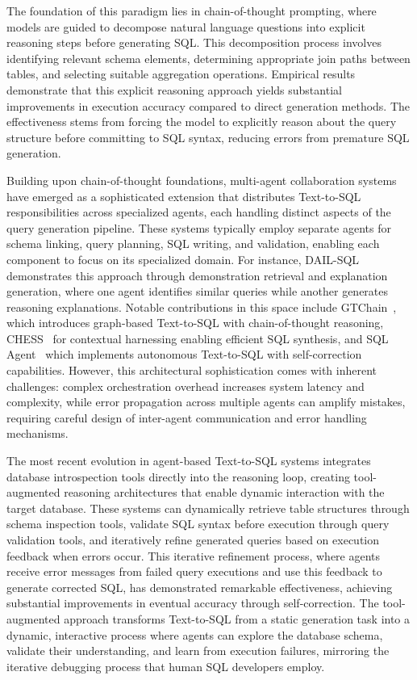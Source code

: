 The foundation of this paradigm lies in chain-of-thought prompting, where models are guided to decompose natural language questions into explicit reasoning steps before generating SQL. This decomposition process involves identifying relevant schema elements, determining appropriate join paths between tables, and selecting suitable aggregation operations. Empirical results demonstrate that this explicit reasoning approach yields substantial improvements in execution accuracy compared to direct generation methods. The effectiveness stems from forcing the model to explicitly reason about the query structure before committing to SQL syntax, reducing errors from premature SQL generation.

Building upon chain-of-thought foundations, multi-agent collaboration systems have emerged as a sophisticated extension that distributes Text-to-SQL responsibilities across specialized agents, each handling distinct aspects of the query generation pipeline. These systems typically employ separate agents for schema linking, query planning, SQL writing, and validation, enabling each component to focus on its specialized domain. For instance, DAIL-SQL demonstrates this approach through demonstration retrieval and explanation generation, where one agent identifies similar queries while another generates reasoning explanations. Notable contributions in this space include GTChain~\cite{chase2024gtchain}, which introduces graph-based Text-to-SQL with chain-of-thought reasoning, CHESS~\cite{jiao2024chess} for contextual harnessing enabling efficient SQL synthesis, and SQL Agent~\cite{alberta2024sqlagent} which implements autonomous Text-to-SQL with self-correction capabilities. However, this architectural sophistication comes with inherent challenges: complex orchestration overhead increases system latency and complexity, while error propagation across multiple agents can amplify mistakes, requiring careful design of inter-agent communication and error handling mechanisms.

The most recent evolution in agent-based Text-to-SQL systems integrates database introspection tools directly into the reasoning loop, creating tool-augmented reasoning architectures that enable dynamic interaction with the target database. These systems can dynamically retrieve table structures through schema inspection tools, validate SQL syntax before execution through query validation tools, and iteratively refine generated queries based on execution feedback when errors occur. This iterative refinement process, where agents receive error messages from failed query executions and use this feedback to generate corrected SQL, has demonstrated remarkable effectiveness, achieving substantial improvements in eventual accuracy through self-correction. The tool-augmented approach transforms Text-to-SQL from a static generation task into a dynamic, interactive process where agents can explore the database schema, validate their understanding, and learn from execution failures, mirroring the iterative debugging process that human SQL developers employ.


